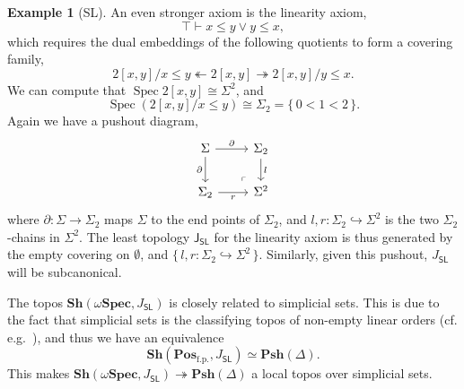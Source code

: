 \documentclass[12pt]{amsart}
\theoremstyle{definition}
\newtheorem{example}[theorem]{Example}
\newcommand{\mb}[1]{\mathbf{#1}}
\newcommand{\mr}[1]{\mathrm{#1}}
\newcommand{\ms}[1]{\mathsf{#1}}
\newcommand{\Pos}{\mb{Pos}}
\newcommand{\sh}{\mb{Sh}}
\newcommand{\psh}{\mb{Psh}}
\newcommand{\set}[1]{\{\,#1\,\}}
\newcommand{\surj}{\twoheadrightarrow}
\newcommand{\hook}{\hookrightarrow}
\newcommand{\fp}{_{\mr{f.p.}}}
\newcommand{\emp}{\emptyset}
\newcommand{\wSpec}{\omega\mb{Spec}}
\newcommand{\spec}{\operatorname{Spec}}
\begin{document}
\begin{example}[SL]
  An even stronger axiom is the linearity axiom, 
  \[ \top \vdash x \le y \vee y \le x, \]
  which requires the dual embeddings of the following quotients to form a covering family,
  \[ 2[x,y]/x \le y \twoheadleftarrow 2[x,y] \surj 2[x,y]/y \le x. \]
  We can compute that $\spec 2[x,y] \cong \Sigma^2$, and 
  \[ \spec(2[x,y]/x \le y) \cong \Sigma_2 = \set{0 < 1 < 2}. \]
  Again we have a pushout diagram,
  \[
  \begin{tikzcd}
    \Sigma \ar[r, "\partial"] \ar[d, "\partial"'] & \Sigma_2 \ar[d, "l"] \\ 
    \Sigma_2 \ar[r, "r"'] & \Sigma^2
    \arrow["\lrcorner"{anchor=center, pos=0.125, rotate=180}, draw=none, from=2-2, to=1-1]
  \end{tikzcd}
  \]
  where $\partial : \Sigma \to \Sigma_2$ maps $\Sigma$ to the end points of $\Sigma_2$, and $l,r : \Sigma_2 \hook \Sigma^2$ is the two $\Sigma_2$-chains in $\Sigma^2$. The least topology $\ms J_{\ms{SL}}$ for the linearity axiom is thus generated by the empty covering on $\emp$, and $\set{l,r : \Sigma_2 \hook \Sigma^2}$. Similarly, given this pushout, $J_{\ms{SL}}$ will be subcanonical.

  The topos $\sh(\wSpec,J_{\ms{SL}})$ is closely related to simplicial sets. This is due to the fact that simplicial sets is the classifying topos of non-empty linear orders (cf. e.g.~\cite{maclane2012sheaves}), and thus we have an equivalence 
  \[ \sh(\Pos\fp,J_{\ms{SL}}) \simeq \psh(\Delta). \]
  This makes $\sh(\wSpec,J_{\ms{SL}}) \surj \psh(\Delta)$ a local topos over simplicial sets.
\end{example}
\end{document}

